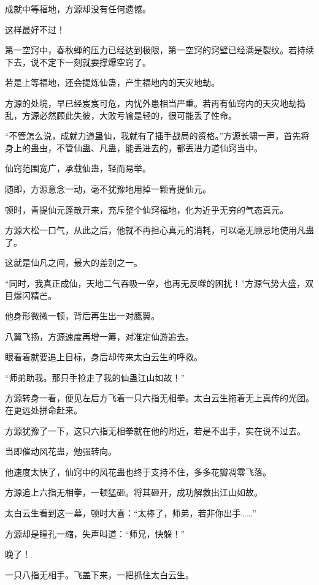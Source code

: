 
\begin{this_body}

成就中等福地，方源却没有任何遗憾。

这样最好不过！

第一空窍中，春秋蝉的压力已经达到极限，第一空窍的窍壁已经满是裂纹。若持续下去，说不定下一刻就要撑爆空窍了。

若是上等福地，还会提炼仙蛊，产生福地内的天灾地劫。

方源的处境，早已经岌岌可危，内忧外患相当严重。若再有仙窍内的天灾地劫捣乱，方源必然顾此失彼，大败亏输是轻的，很可能丢了性命。

“不管怎么说，成就力道蛊仙，我就有了插手战局的资格。”方源长啸一声，首先将身上的蛊虫，不管仙蛊、凡蛊，能丢进去的，都丢进力道仙窍当中。

仙窍范围宽广，承载仙蛊，轻而易举。

随即，方源意念一动，毫不犹豫地用掉一颗青提仙元。

顿时，青提仙元蓬散开来，充斥整个仙窍福地，化为近乎无穷的气态真元。

方源大松一口气，从此之后，他就不再担心真元的消耗，可以毫无顾忌地使用凡蛊了。

这就是仙凡之间，最大的差别之一。

“同时，我真正成仙，天地二气吞吸一空，也再无反噬的困扰！”方源气势大盛，双目爆闪精芒。

他身形微微一顿，背后再生出一对鹰翼。

八翼飞扬，方源速度再增一筹，对准定仙游追去。

眼看着就要追上目标，身后却传来太白云生的呼救。

“师弟助我。那只手抢走了我的仙蛊江山如故！”

方源转身一看，便见左后方飞着一只六指无相拳。太白云生拖着无上真传的光团。在更远处拼命赶来。

方源犹豫了一下，这只六指无相拳就在他的附近，若是不出手，实在说不过去。

当即催动风花蛊，勉强转向。

他速度太快了，仙窍中的风花蛊也终于支持不住，多多花瓣凋零飞落。

方源追上六指无相拳，一顿猛砸。将其砸开，成功解救出江山如故。

太白云生看到这一幕，顿时大喜：“太棒了，师弟，若非你出手……”

方源却是瞳孔一缩，失声叫道：“师兄，快躲！”

晚了！

一只八指无相手。飞盖下来，一把抓住太白云生。


\end{this_body}
